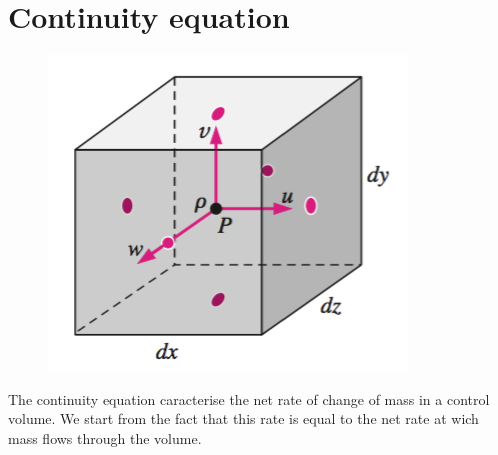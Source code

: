 \section{Continuity equation}
	\begin{figure}
		\vspace{-5mm}
		\includegraphics[scale=0.5]{ch2/3}
		\end{figure}
			The continuity equation caracterise the net rate of change of mass in a control volume. We start from the fact that this rate is equal to the net rate at wich mass flows through the volume. \\
			

